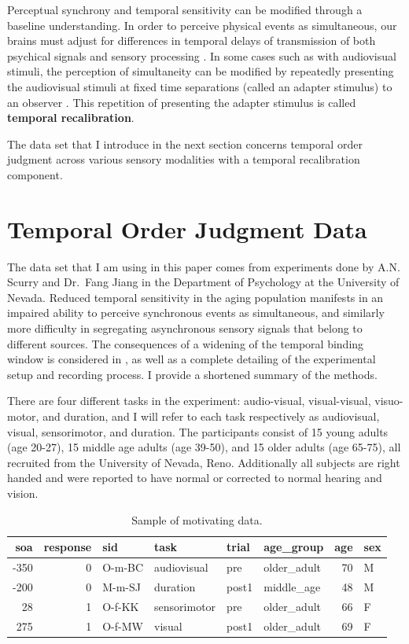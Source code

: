 \documentclass[11pt, oneside]{book}
\begin{document}
Perceptual synchrony and temporal sensitivity can be modified through a baseline understanding. In order to perceive physical events as simultaneous, our brains must adjust for differences in temporal delays of transmission of both psychical signals and sensory processing \citep{fujisaki2004recalibration}. In some cases such as with audiovisual stimuli, the perception of simultaneity can be modified by repeatedly presenting the audiovisual stimuli at fixed time separations (called an adapter stimulus) to an observer \citep{vroomen2004recalibration}. This repetition of presenting the adapter stimulus is called \textbf{temporal recalibration}.

The data set that I introduce in the next section concerns temporal order judgment across various sensory modalities with a temporal recalibration component.

\hypertarget{temporal-order-judgment-data}{%
\section{Temporal Order Judgment Data}\label{temporal-order-judgment-data}}

The data set that I am using in this paper comes from experiments done by A.N. Scurry and Dr.~Fang Jiang in the Department of Psychology at the University of Nevada. Reduced temporal sensitivity in the aging population manifests in an impaired ability to perceive synchronous events as simultaneous, and similarly more difficulty in segregating asynchronous sensory signals that belong to different sources. The consequences of a widening of the temporal binding window is considered in \citet{scurry2019aging}, as well as a complete detailing of the experimental setup and recording process. I provide a shortened summary of the methods.

There are four different tasks in the experiment: audio-visual, visual-visual, visuo-motor, and duration, and I will refer to each task respectively as audiovisual, visual, sensorimotor, and duration. The participants consist of 15 young adults (age 20-27), 15 middle age adults (age 39-50), and 15 older adults (age 65-75), all recruited from the University of Nevada, Reno. Additionally all subjects are right handed and were reported to have normal or corrected to normal hearing and vision.

\begin{table}[!h]

\caption{\label{tab:multitask-data}Sample of motivating data.}
\centering
\begin{tabular}[t]{rrllllrl}
\toprule
soa & response & sid & task & trial & age\_group & age & sex\\
\midrule
-350 & 0 & O-m-BC & audiovisual & pre & older\_adult & 70 & M\\
-200 & 0 & M-m-SJ & duration & post1 & middle\_age & 48 & M\\
28 & 1 & O-f-KK & sensorimotor & pre & older\_adult & 66 & F\\
275 & 1 & O-f-MW & visual & post1 & older\_adult & 69 & F\\
\bottomrule
\end{tabular}
\end{table}
\end{document}
